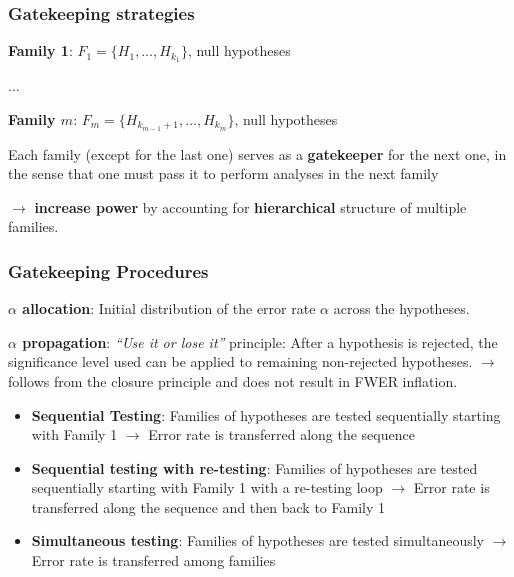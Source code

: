 \documentclass[xcolor={dvipsnames}]{beamer}
\newcommand{\rbf}[1]{\textcolor{redUnipd}{ #1}}
\begin{document}
\begin{frame}
\frametitle{Gatekeeping strategies}
\rbf{\textbf{Family 1}}:
$F_1 = \{H_1, \dots, H_{k_1}\}$, null hypotheses

$\dots$

\rbf{\textbf{Family $m$}}:
$F_m = \{H_{k_{m-1} +1}, \dots, H_{k_m}\}$, null hypotheses

\bigskip

Each family (except for the last one) serves as a \textbf{gatekeeper} for the next one, in the sense that one must pass it to perform analyses in the next family 
\bigskip

$\rightarrow$ \textbf{increase power} by accounting for \rbf{\textbf{hierarchical}} structure of multiple families.
\end{frame}

\begin{frame}
\frametitle{Gatekeeping Procedures}


\rbf{\textbf{$\alpha$ allocation}}: Initial distribution of the error rate $\alpha$ across the hypotheses.
\medskip

\rbf{\textbf{$\alpha$ propagation}}: \emph{``Use it or lose it''} principle: After a hypothesis is rejected, the significance level used can be applied to remaining non-rejected hypotheses. $\rightarrow$ follows from the closure principle and does not result in FWER inflation.

\medskip

\begin{itemize}
    \item \textbf{Sequential Testing}: Families of hypotheses are tested sequentially starting with Family 1 $\rightarrow$ Error rate is transferred along the sequence
    \item \textbf{Sequential testing with re-testing}: Families of hypotheses are tested sequentially starting with Family 1 with a re-testing loop $\rightarrow$ Error rate is transferred along the sequence and then back to Family 1
    \item \textbf{Simultaneous testing}: Families of hypotheses are tested simultaneously $\rightarrow$ Error rate is transferred among families
\end{itemize}

    
\end{frame}
\end{document}
